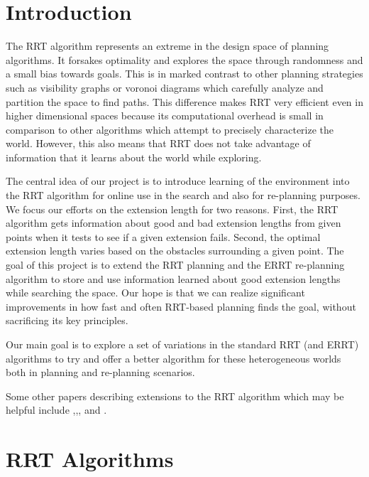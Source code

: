 \documentclass[10pt,twoside,twocolumn]{article}
\begin{document}
\maketitle

\section{Introduction} 
The RRT algorithm represents an extreme in the design space of planning algorithms.  
It forsakes optimality and explores the space through randomness and a small bias towards goals.  This is in marked contrast to other planning strategies such as visibility graphs or voronoi diagrams which carefully analyze and partition the space to find paths.  
This difference makes RRT very efficient even in higher dimensional spaces because its computational overhead is small in comparison to other algorithms which attempt to precisely characterize the world.  However, this also means that RRT does not take advantage of information that it learns about the world while exploring.

The central idea of our project is to introduce learning of the environment into the RRT algorithm for online use in the search and also for re-planning purposes.  We focus our efforts on the extension length for two reasons.  First, the RRT algorithm gets information about good and bad extension lengths from given points when it tests to see if a given extension fails.  Second, the optimal extension length varies based on the obstacles surrounding a given point.  The goal of this project is to extend the RRT planning and the ERRT re-planning algorithm to store and use information learned about good extension lengths while searching the space.  Our hope is that we can realize significant improvements in how fast and often RRT-based planning finds the goal, without sacrificing its key principles.

Our main goal is to explore a set of variations in the standard RRT (and ERRT) algorithms to try and offer a better algorithm for these heterogeneous worlds both in planning and re-planning scenarios.

Some other papers describing extensions to the RRT algorithm which may be helpful include \cite{Lavalle98rapidly-exploringrandom},\cite{Lindemann04incrementallyreducing},\cite{Jaillet05adaptivetuning}, and \cite{moplan2009}.


\section{RRT Algorithms}
\end{document}
